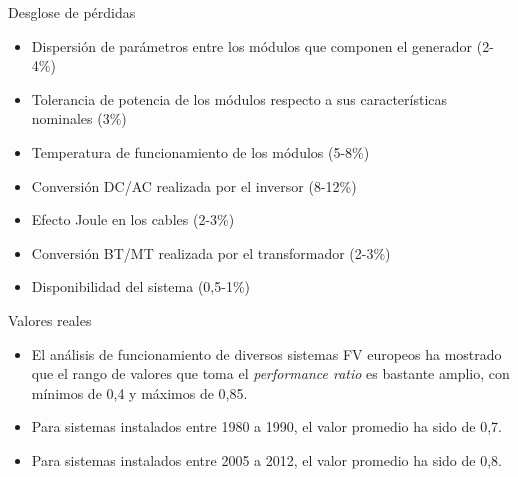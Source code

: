 \documentclass[aspectratio=169, usenames,svgnames,dvipsnames]{beamer}
\begin{document}
\begin{frame}[label={sec:org48aa246}]{Desglose de pérdidas}
\begin{itemize}
\item \alert{Dispersión de parámetros} entre los módulos que componen el
generador (2-4\%)

\item \alert{Tolerancia de potencia} de los módulos respecto a sus
características nominales (3\%)

\item \alert{Temperatura} de funcionamiento de los módulos (5-8\%)

\item Conversión DC/AC realizada por el \alert{inversor} (8-12\%)

\item \alert{Efecto Joule} en los cables (2-3\%)

\item Conversión BT/MT realizada por el \alert{transformador} (2-3\%)

\item \alert{Disponibilidad} del sistema (0,5-1\%)
\end{itemize}
\end{frame}


\begin{frame}[label={sec:org155f0c8}]{Valores reales}
\begin{itemize}
\item El análisis de funcionamiento de diversos sistemas FV europeos ha
mostrado que el rango de valores que toma el \emph{performance ratio} es
bastante amplio, con mínimos de 0,4 y máximos de 0,85.

\item Para sistemas instalados entre 1980 a 1990, \alert{el valor promedio ha sido de
0,7}.

\item Para sistemas instalados entre 2005 a 2012, \alert{el valor promedio ha
sido de 0,8}.
\end{itemize}
\end{frame}
\end{document}
